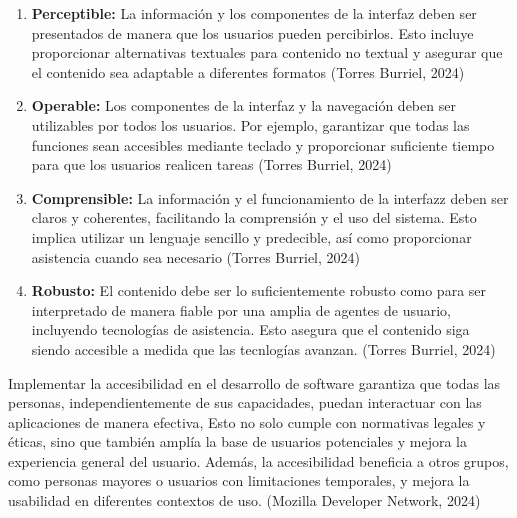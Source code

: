 \begin{enumerate}
    \item \textbf{Perceptible:} La información y los componentes de la interfaz deben ser presentados de manera que los usuarios pueden percibirlos. Esto incluye proporcionar alternativas textuales para contenido no textual 
    y asegurar que el contenido sea adaptable a diferentes formatos (Torres Burriel, 2024)
    \item \textbf{Operable:} Los componentes de la interfaz y la navegación deben ser utilizables por todos los usuarios. Por ejemplo, garantizar que todas las funciones sean accesibles mediante teclado y proporcionar suficiente tiempo para que los 
    usuarios realicen tareas (Torres Burriel, 2024)
    \item \textbf{Comprensible:} La información y el funcionamiento de la interfazz deben ser claros y coherentes, facilitando la comprensión y el uso del sistema. Esto implica utilizar un lenguaje sencillo y predecible, así como proporcionar asistencia cuando sea necesario (Torres Burriel, 2024)
    \item \textbf{Robusto:} El contenido debe ser lo suficientemente robusto como para ser interpretado de manera fiable por una amplia de agentes de usuario, incluyendo tecnologías de asistencia. Esto asegura que el contenido siga siendo accesible a medida que las tecnlogías avanzan. (Torres Burriel, 2024)
\end{enumerate}

Implementar la accesibilidad en el desarrollo de software garantiza que todas las personas, independientemente de sus capacidades, puedan interactuar con las aplicaciones de manera efectiva,
Esto no solo cumple con normativas legales y éticas, sino que también amplía la base de usuarios potenciales y mejora la experiencia general del usuario. Además, la accesibilidad beneficia a otros grupos, como personas mayores o 
usuarios con limitaciones temporales, y mejora la usabilidad en diferentes contextos de uso. (Mozilla Developer Network, 2024)